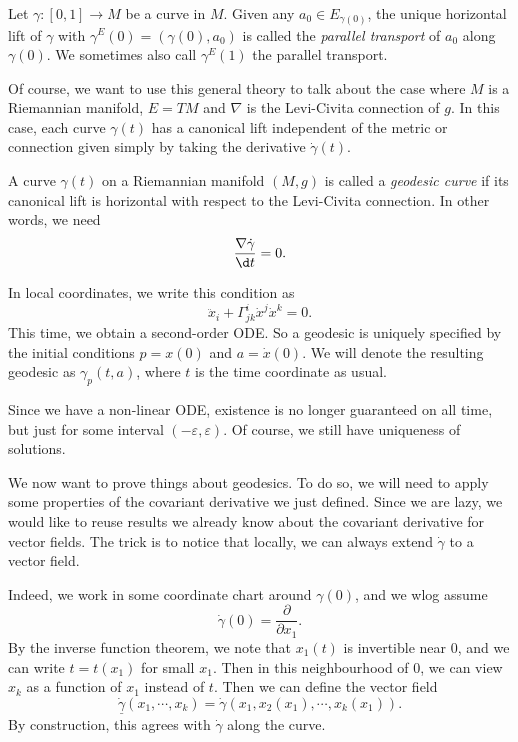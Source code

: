 \documentclass[a4paper]{article}
\begin{document}
\begin{defi}
  Let $\gamma : [0, 1] \to M$ be a curve in $M$. Given any $a_0 \in E_{\gamma(0)}$, the unique horizontal lift of $\gamma$ with $\gamma^E(0) = (\gamma(0), a_0)$ is called the \emph{parallel transport} of $a_0$ along $\gamma(0)$. We sometimes also call $\gamma^E(1)$ the parallel transport.
\end{defi}
Of course, we want to use this general theory to talk about the case where $M$ is a Riemannian manifold, $E = TM$ and $\nabla$ is the Levi-Civita connection of $g$. In this case, each curve $\gamma(t)$ has a canonical lift independent of the metric or connection given simply by taking the derivative $\dot{\gamma}(t)$.
\begin{defi}[Geodesic]
  A curve $\gamma(t)$ on a Riemannian manifold $(M, g)$ is called a \emph{geodesic curve} if its canonical lift is horizontal with respect to the Levi-Civita connection. In other words, we need
  \[
    \frac{\nabla \dot{\gamma}}{\d t} = 0.
  \]
\end{defi}
In local coordinates, we write this condition as
\[
  \ddot{x}_i + \Gamma^i_{jk}\dot{x}^j \dot{x}^k = 0.
\]
This time, we obtain a second-order ODE. So a geodesic is uniquely specified by the initial conditions $p = x(0)$ and $a = \dot{x}(0)$. We will denote the resulting geodesic as $\gamma_p(t, a)$, where $t$ is the time coordinate as usual.

Since we have a non-linear ODE, existence is no longer guaranteed on all time, but just for some interval $(-\varepsilon, \varepsilon)$. Of course, we still have uniqueness of solutions.

We now want to prove things about geodesics. To do so, we will need to apply some properties of the covariant derivative we just defined. Since we are lazy, we would like to reuse results we already know about the covariant derivative for vector fields. The trick is to notice that locally, we can always extend $\dot{\gamma}$ to a vector field.

Indeed, we work in some coordinate chart around $\gamma(0)$, and we wlog assume
\[
  \dot{\gamma}(0) = \frac{\partial}{\partial x_1}.
\]
By the inverse function theorem, we note that $x_1(t)$ is invertible near $0$, and we can write $t = t(x_1)$ for small $x_1$. Then in this neighbourhood of $0$, we can view $x_k$ as a function of $x_1$ instead of $t$. Then we can define the vector field
\[
  \dot{\underline{\gamma}}(x_1, \cdots, x_k) = \dot{\gamma}(x_1, x_2(x_1), \cdots, x_k(x_1)).
\]
By construction, this agrees with $\dot{\gamma}$ along the curve.
\end{document}
